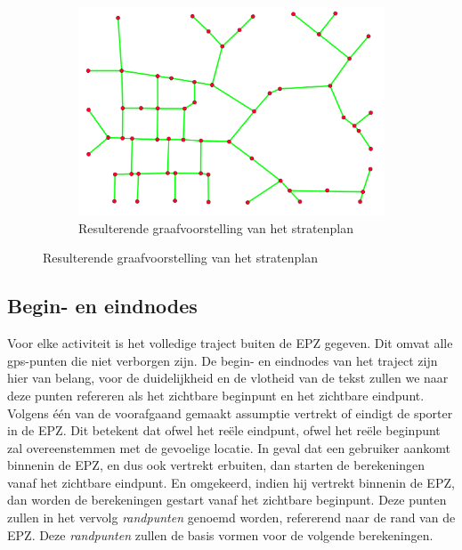 \begin{figure}[h]
\begin{subfigure}[b]{.4\textwidth}
        \includegraphics[width=1\textwidth]{fig/RoadGraph/Graph.png}
        \caption{Resulterende graafvoorstelling van het stratenplan}
    \end{subfigure}
\end{figure}

\subsection{Begin- en eindnodes}
Voor elke activiteit is het volledige traject buiten de \ac{EPZ} gegeven. Dit
omvat alle \ac{gps}-punten die niet verborgen zijn. De begin- en eindnodes van
het traject zijn hier van belang, voor de duidelijkheid en de vlotheid van de
tekst zullen we naar deze punten refereren als het zichtbare beginpunt en het
zichtbare eindpunt. Volgens één van de voorafgaand gemaakt assumptie vertrekt
of eindigt de sporter in de \ac{EPZ}. Dit betekent dat ofwel het reële
eindpunt, ofwel het reële beginpunt zal overeenstemmen met de gevoelige
locatie. In geval dat een gebruiker aankomt binnenin de \ac{EPZ}, en dus ook
vertrekt erbuiten, dan starten de berekeningen vanaf het zichtbare eindpunt. En
omgekeerd, indien hij vertrekt binnenin de \ac{EPZ}, dan worden de berekeningen
gestart vanaf het zichtbare beginpunt. Deze punten zullen in het vervolg
\textit{randpunten} genoemd worden, refererend naar de rand van de \ac{EPZ}.
Deze \textit{randpunten} zullen de basis vormen voor de volgende berekeningen.

